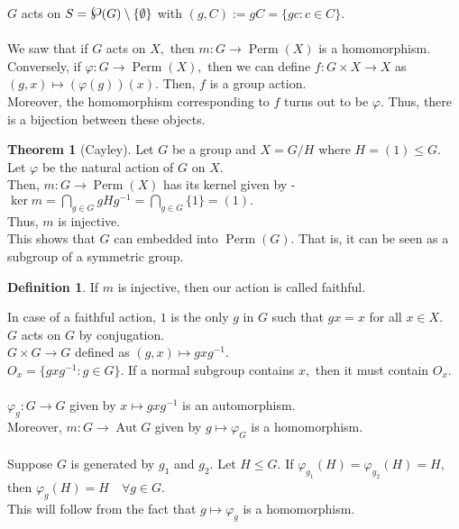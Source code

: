 \documentclass[12 pt, a4paper, toc=graduated, oneside]{article}
\theoremstyle{definition}
\newtheorem{defn}{Definition}
\newtheorem{theorem}{Theorem}
\newcommand{\pset}{\raisebox{.15\baselineskip}{{\Large\ensuremath{\wp}}}}
\newcommand{\Aut}{\operatorname{Aut}}
\begin{document}
$G$ acts on $S = \pset (G) \setminus \{\emptyset\}$ with $(g, C) := gC = \{gc : c \in C\}.$\\~\\
We saw that if $G$ acts on $X,$ then $m:G\to\operatorname{Perm}(X)$ is a homomorphism.\\
Conversely, if $\varphi : G \to \operatorname{Perm}(X),$ then we can define $f:G\times X \to X$ as $(g, x) \mapsto (\varphi(g))(x).$ Then, $f$ is a group action.\\
Moreover, the homomorphism corresponding to $f$ turns out to be $\varphi.$ Thus, there is a bijection between these objects.\\
\begin{theorem}[Cayley]
	Let $G$ be a group and $X = G/H$ where $H = (1) \le G.$\\
	Let $\varphi$ be the natural action of $G$ on $X.$\\
	Then, $m : G \to \operatorname{Perm}(X)$ has its kernel given by -\\
	$\ker m = \displaystyle\bigcap_{g \in G}gHg^{-1} = \displaystyle\bigcap_{g \in G}\{1\} = (1).$\\
	Thus, $m$ is injective.\\
	This shows that $G$ can embedded into $\operatorname{Perm}(G).$ That is, it can be seen as a subgroup of a symmetric group.
\end{theorem}
\begin{defn}
	If $m$ is injective, then our action is called faithful.
\end{defn}
In case of a faithful action, $1$ is the only $g$ in $G$ such that $gx = x$ for all $x \in X.$\\
$G$ acts on $G$ by conjugation.\\
$G \times G \to G$ defined as $(g, x) \mapsto gxg^{-1}.$\\
$O_x = \{gxg^{-1} : g \in G\}.$ If a normal subgroup contains $x,$ then it must contain $O_x.$\\~\\
$\varphi_g : G \to G$ given by $x \mapsto gxg^{-1}$ is an automorphism.\\
Moreover, $m : G \to \Aut G$ given by $g \mapsto \varphi_G$ is a homomorphism.\\~\\
Suppose $G$ is generated by $g_1$ and $g_2.$ Let $H \le G.$ If $\varphi_{g_1}(H) = \varphi_{g_2}(H) = H,$ then $\varphi_{g}(H) = H \quad \forall g \in G.$\\
This will follow from the fact that $g \mapsto \varphi_g$ is a homomorphism.\\
\end{document}
